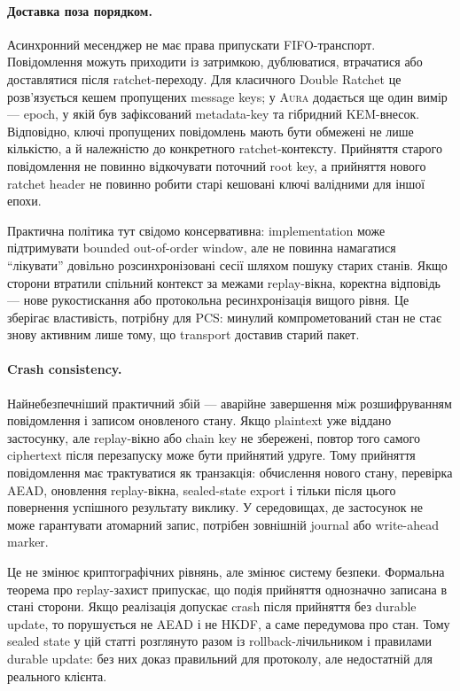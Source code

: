 \documentclass[11pt,a4paper]{article}
\theoremstyle{definition}
\newcommand{\Aura}{\mbox{\normalfont\scshape Aura}}
\begin{document}
\paragraph{Доставка поза порядком.}
Асинхронний месенджер не має права припускати FIFO-транспорт.
Повідомлення можуть приходити із затримкою, дублюватися, втрачатися
або доставлятися після ratchet-переходу. Для класичного Double Ratchet
це розв'язується кешем пропущених message keys; у \Aura{} додається
ще один вимір — epoch, у якій був зафіксований metadata-key та
гібридний KEM-внесок. Відповідно, ключі пропущених повідомлень мають
бути обмежені не лише кількістю, а й належністю до конкретного
ratchet-контексту. Прийняття старого повідомлення не повинно
відкочувати поточний root key, а прийняття нового ratchet header не
повинно робити старі кешовані ключі валідними для іншої епохи.

Практична політика тут свідомо консервативна: implementation може
підтримувати bounded out-of-order window, але не повинна намагатися
``лікувати'' довільно розсинхронізовані сесії шляхом пошуку старих
станів. Якщо сторони втратили спільний контекст за межами replay-вікна,
коректна відповідь — нове рукостискання або протокольна ресинхронізація
вищого рівня. Це зберігає властивість, потрібну для PCS: минулий
компрометований стан не стає знову активним лише тому, що transport
доставив старий пакет.

\paragraph{Crash consistency.}
Найнебезпечніший практичний збій — аварійне завершення між
розшифруванням повідомлення і записом оновленого стану. Якщо plaintext
уже віддано застосунку, але replay-вікно або chain key не збережені,
повтор того самого ciphertext після перезапуску може бути прийнятий
удруге. Тому прийняття повідомлення має трактуватися як транзакція:
обчислення нового стану, перевірка AEAD, оновлення replay-вікна,
sealed-state export і тільки після цього повернення успішного результату
виклику. У середовищах, де застосунок не може гарантувати атомарний
запис, потрібен зовнішній journal або write-ahead marker.

Це не змінює криптографічних рівнянь, але змінює систему безпеки.
Формальна теорема про replay-захист припускає, що подія прийняття
однозначно записана в стані сторони. Якщо реалізація допускає crash
після прийняття без durable update, то порушується не AEAD і не HKDF,
а саме передумова про стан. Тому sealed state у цій статті розглянуто
разом із rollback-лічильником і правилами durable update: без них доказ
правильний для протоколу, але недостатній для реального клієнта.
\end{document}
